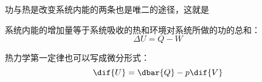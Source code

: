             功与热是改变系统内能的两条也是唯二的途径，这就是\linebreak
            \begin{law}
                系统内能的增加量等于系统吸收的热和环境对系统所做的功的总和：
                \begin{equation}
                    \Delta U = Q - W
                    \nonumber
                \end{equation}
            \end{law}
            热力学第一定律也可以写成微分形式：
            \begin{equation}
                \dif{U} = \dbar{Q} - p\dif{V}
                \nonumber
            \end{equation}
        \subsection[过程介绍]{}
